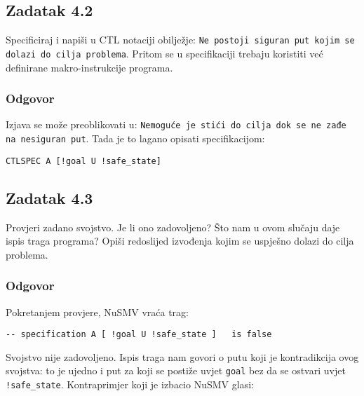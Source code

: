 \documentclass{article}
\newcommand{\zadatak}[1]{\subsection{Zadatak #1}}
\newcommand{\odgovor}{\subsubsection*{Odgovor}}
\newcommand{\code}[1]{\colorbox{blue!11}{\texttt{#1}}}
\begin{document}
\zadatak{4.2}

Specificiraj i napiši u CTL notaciji obilježje: \newline
\code{Ne postoji siguran put kojim se dolazi do cilja problema}. Pritom se u specifikaciji trebaju koristiti već definirane makro-instrukcije programa.

\odgovor

Izjava se može preoblikovati u: \newline
\code{Nemoguće je stići do cilja dok se ne zađe na nesiguran put}. Tada je to lagano opisati specifikacijom:

\begin{verbatim}
CTLSPEC A [!goal U !safe_state]
\end{verbatim}


\zadatak{4.3}

Provjeri zadano svojstvo. Je li ono zadovoljeno? Što nam u ovom slučaju daje ispis traga programa? Opiši redoslijed izvođenja kojim se uspješno dolazi do cilja problema. 

\odgovor

Pokretanjem provjere, NuSMV vraća trag:

\begin{verbatim}
-- specification A [ !goal U !safe_state ]   is false
\end{verbatim}

\noindent
Svojstvo nije zadovoljeno. Ispis traga nam govori o putu koji je kontradikcija ovog svojstva: to je ujedno i put za koji se postiže uvjet \code{goal} bez da se ostvari uvjet \code{!safe\_state}. Kontraprimjer koji je izbacio NuSMV glasi:
\end{document}
